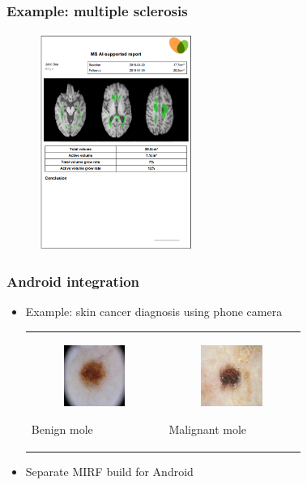 \documentclass[xetex,mathserif,serif]{beamer}
\begin{document}
 
  \begin{frame}
     \frametitle{Example: multiple sclerosis}
        \begin{figure}
             \includegraphics[width=5cm]{pictures/mirfms.png}
         \end{figure}
 \end{frame}

   \begin{frame}
     \frametitle{Android integration}
        \begin{itemize}
             \item Example: skin cancer diagnosis using phone camera
                 \begin{tabular}{p{5cm} p{5cm}}
        \begin{figure}[b]
             \centering
             \includegraphics[width=2.0cm]{pictures/benign.png}
         \end{figure}
         Benign mole
         &
         \begin{figure}[b]
             \centering
             \includegraphics[width=2.0cm]{pictures/malig.png}
         \end{figure}
         Malignant mole
     \end{tabular}
             \item Separate MIRF build for Android
         \end{itemize}
 \end{frame}
 
\end{document}
